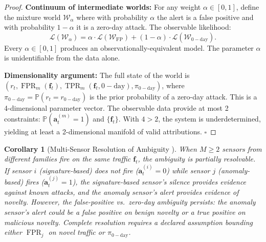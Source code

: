 \documentclass[11pt,a4paper]{article}
\newtheorem{corollary}[theorem]{Corollary}
\theoremstyle{definition}
\theoremstyle{remark}
\DeclareMathOperator{\TPR}{TPR}
\DeclareMathOperator{\FPR}{FPR}
\newcommand{\Pbb}{\mathbb{P}}
\newcommand{\FP}{\mathrm{FP}}
\newcommand{\zeroday}{\mathrm{0-day}}
\newcommand{\alertvec}{\mathbf{a}}
\newcommand{\flowvec}{\mathbf{f}}
\begin{document}
\begin{proof}
\textbf{Continuum of intermediate worlds:} For any weight $\alpha \in [0, 1]$, define the mixture world $\mathcal{W}_\alpha$ where with probability $\alpha$ the alert is a false positive and with probability $1-\alpha$ it is a zero-day attack. The observable likelihood:
\begin{equation}
\mathcal{L}(\mathcal{W}_\alpha) = \alpha \cdot \mathcal{L}(\mathcal{W}_{\FP}) + (1-\alpha) \cdot \mathcal{L}(\mathcal{W}_{\zeroday}).
\label{eq:mixture}
\end{equation}
Every $\alpha \in [0, 1]$ produces an observationally-equivalent model. The parameter $\alpha$ is unidentifiable from the data alone.

\textbf{Dimensionality argument:} The full state of the world is $(r_t, \FPR_m(\flowvec_t), \TPR_m(\flowvec_t, \zeroday), \pi_{\zeroday})$, where $\pi_{\zeroday} = \Pbb(r_t = r_{\zeroday})$ is the prior probability of a zero-day attack. This is a 4-dimensional parameter vector. The observable data provide at most 2 constraints: $\Pbb(\alertvec_t^{(m)} = 1)$ and $\{\flowvec_t\}$. With $4 > 2$, the system is underdetermined, yielding at least a 2-dimensional manifold of valid attributions. $\square$
\end{proof}

\begin{corollary}[Multi-Sensor Resolution of Ambiguity ]
\label{cor:multi_resolution}
When $M \geq 2$ sensors from different families fire on the same traffic $\flowvec_t$, the ambiguity is partially resolvable. If sensor $i$ (signature-based) does not fire ($\alertvec_t^{(i)} = 0$) while sensor $j$ (anomaly-based) fires ($\alertvec_t^{(j)} = 1$), the signature-based sensor's silence provides evidence against known attacks, and the anomaly sensor's alert provides evidence of novelty. However, the false-positive vs.\ zero-day ambiguity persists: the anomaly sensor's alert could be a false positive on benign novelty or a true positive on malicious novelty. Complete resolution requires a declared assumption bounding either $\FPR_j$ on novel traffic or $\pi_{\zeroday}$.
\end{corollary}
\end{document}
